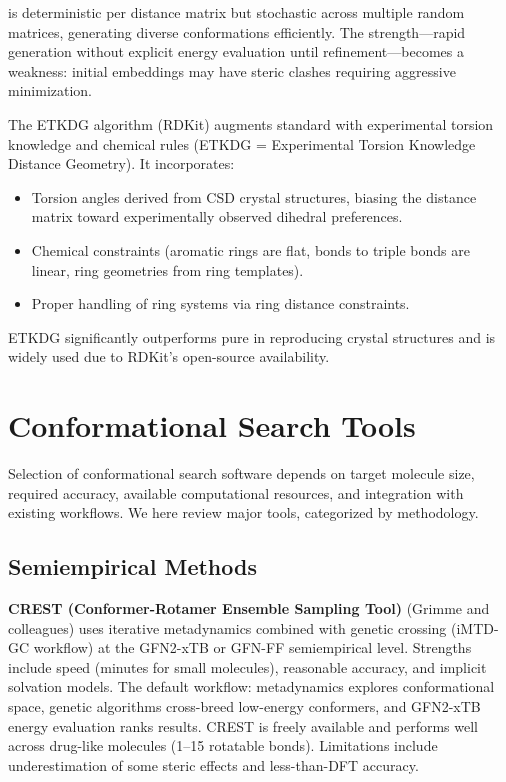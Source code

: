 \documentclass[12pt]{article}
\begin{document}
\DG is deterministic per distance matrix but stochastic across multiple random matrices, generating diverse conformations efficiently. The strength---rapid generation without explicit energy evaluation until refinement---becomes a weakness: initial embeddings may have steric clashes requiring aggressive minimization.

The ETKDG algorithm (RDKit) augments standard \DG with experimental torsion knowledge and chemical rules (ETKDG = Experimental Torsion Knowledge Distance Geometry). It incorporates:

\begin{itemize}
\item Torsion angles derived from CSD crystal structures, biasing the distance matrix toward experimentally observed dihedral preferences.
\item Chemical constraints (aromatic rings are flat, bonds to triple bonds are linear, ring geometries from ring templates).
\item Proper handling of ring systems via ring distance constraints.
\end{itemize}

ETKDG significantly outperforms pure \DG in reproducing crystal structures and is widely used due to RDKit's open-source availability.

\section{Conformational Search Tools}

Selection of conformational search software depends on target molecule size, required accuracy, available computational resources, and integration with existing workflows. We here review major tools, categorized by methodology.

\subsection{Semiempirical Methods}

\textbf{CREST (Conformer-Rotamer Ensemble Sampling Tool)} (Grimme and colleagues) uses iterative metadynamics combined with genetic crossing (iMTD-GC workflow) at the GFN2-xTB or GFN-FF semiempirical level. Strengths include speed (minutes for small molecules), reasonable accuracy, and implicit solvation models. The default workflow: metadynamics explores conformational space, genetic algorithms cross-breed low-energy conformers, and GFN2-xTB energy evaluation ranks results. CREST is freely available and performs well across drug-like molecules (1--15 rotatable bonds). Limitations include underestimation of some steric effects and less-than-DFT accuracy.
\end{document}
